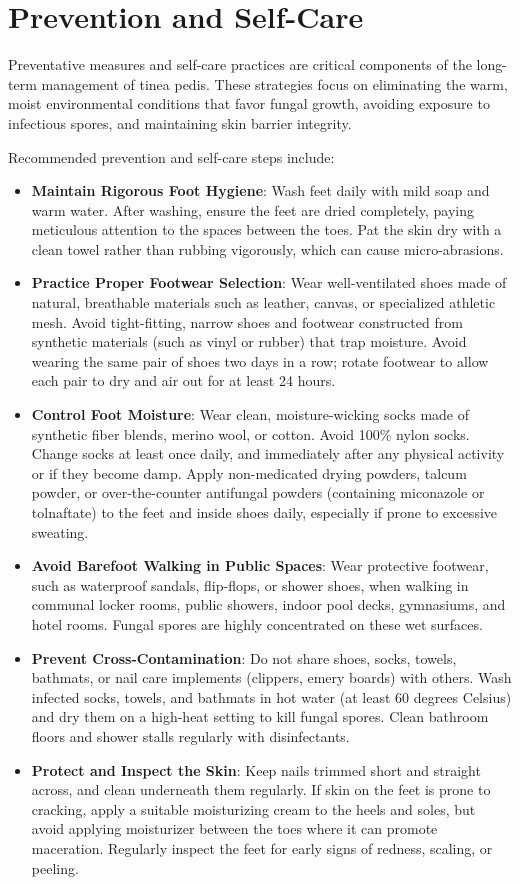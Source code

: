 \section*{Prevention and Self-Care}
Preventative measures and self-care practices are critical components of the long-term management of tinea pedis. These strategies focus on eliminating the warm, moist environmental conditions that favor fungal growth, avoiding exposure to infectious spores, and maintaining skin barrier integrity.

Recommended prevention and self-care steps include:
\begin{itemize}
    \item \textbf{Maintain Rigorous Foot Hygiene}: Wash feet daily with mild soap and warm water. After washing, ensure the feet are dried completely, paying meticulous attention to the spaces between the toes. Pat the skin dry with a clean towel rather than rubbing vigorously, which can cause micro-abrasions.
    \item \textbf{Practice Proper Footwear Selection}: Wear well-ventilated shoes made of natural, breathable materials such as leather, canvas, or specialized athletic mesh. Avoid tight-fitting, narrow shoes and footwear constructed from synthetic materials (such as vinyl or rubber) that trap moisture. Avoid wearing the same pair of shoes two days in a row; rotate footwear to allow each pair to dry and air out for at least 24 hours.
    \item \textbf{Control Foot Moisture}: Wear clean, moisture-wicking socks made of synthetic fiber blends, merino wool, or cotton. Avoid 100\% nylon socks. Change socks at least once daily, and immediately after any physical activity or if they become damp. Apply non-medicated drying powders, talcum powder, or over-the-counter antifungal powders (containing miconazole or tolnaftate) to the feet and inside shoes daily, especially if prone to excessive sweating.
    \item \textbf{Avoid Barefoot Walking in Public Spaces}: Wear protective footwear, such as waterproof sandals, flip-flops, or shower shoes, when walking in communal locker rooms, public showers, indoor pool decks, gymnasiums, and hotel rooms. Fungal spores are highly concentrated on these wet surfaces.
    \item \textbf{Prevent Cross-Contamination}: Do not share shoes, socks, towels, bathmats, or nail care implements (clippers, emery boards) with others. Wash infected socks, towels, and bathmats in hot water (at least 60 degrees Celsius) and dry them on a high-heat setting to kill fungal spores. Clean bathroom floors and shower stalls regularly with disinfectants.
    \item \textbf{Protect and Inspect the Skin}: Keep nails trimmed short and straight across, and clean underneath them regularly. If skin on the feet is prone to cracking, apply a suitable moisturizing cream to the heels and soles, but avoid applying moisturizer between the toes where it can promote maceration. Regularly inspect the feet for early signs of redness, scaling, or peeling.
\end{itemize}

